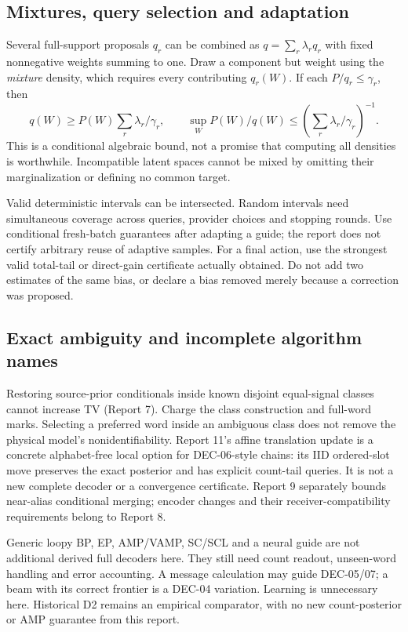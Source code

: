 \documentclass[10pt,a4paper]{article}
\begin{document}
\subsection{Mixtures, query selection and adaptation}
Several full-support proposals $q_r$ can be combined as
$q=\sum_r\lambda_rq_r$ with fixed nonnegative weights summing to one.
Draw a component but weight using the \emph{mixture} density, which requires every contributing $q_r(W)$.
If each $P/q_r\leq\gamma_r$, then
\[
 q(W)\geq P(W)\sum_r\lambda_r/\gamma_r,\qquad
 \sup_W P(W)/q(W)\leq\left(\sum_r\lambda_r/\gamma_r\right)^{-1}.
\]
This is a conditional algebraic bound, not a promise that computing all densities is worthwhile.
Incompatible latent spaces cannot be mixed by omitting their marginalization or defining no common target.

Valid deterministic intervals can be intersected. Random intervals need simultaneous coverage across
queries, provider choices and stopping rounds. Use conditional fresh-batch guarantees after adapting a
guide; the report does not certify arbitrary reuse of adaptive samples.
For a final action, use the strongest valid total-tail or direct-gain certificate actually obtained.
Do not add two estimates of the same bias, or declare a bias removed merely because a correction was proposed.

\subsection{Exact ambiguity and incomplete algorithm names}
Restoring source-prior conditionals inside known disjoint equal-signal classes cannot increase TV
(Report 7). Charge the class construction and full-word marks. Selecting a preferred word inside an
ambiguous class does not remove the physical model's nonidentifiability.
Report 11's affine translation update is a concrete alphabet-free local option for DEC-06-style chains:
its IID ordered-slot move preserves the exact posterior and has explicit count-tail queries. It is not
a new complete decoder or a convergence certificate. Report 9 separately bounds near-alias conditional
merging; encoder changes and their receiver-compatibility requirements belong to Report 8.

Generic loopy BP, EP, AMP/VAMP, SC/SCL and a neural guide are not additional derived full decoders here.
They still need count readout, unseen-word handling and error accounting. A message calculation may
guide DEC-05/07; a beam with its correct frontier is a DEC-04 variation. Learning is unnecessary here.
Historical D2 remains an empirical comparator, with no new count-posterior or AMP guarantee from this report.
\end{document}

